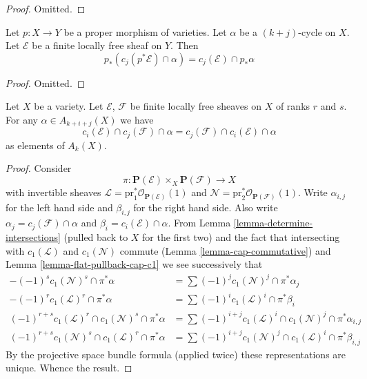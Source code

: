 \begin{proof}
Omitted.
\end{proof}

\begin{lemma}
\label{lemma-pushforward-cap-cj}
Let $p : X \to Y$ be a proper morphism of varieties.
Let $\alpha$ be a $(k + j)$-cycle on $X$.
Let $\mathcal{E}$ be a finite locally free sheaf on $Y$.
Then
$$
p_*(c_j(p^*\mathcal{E}) \cap \alpha) = c_j(\mathcal{E}) \cap p_*\alpha
$$
\end{lemma}

\begin{proof}
Omitted.
\end{proof}

\begin{lemma}
\label{lemma-cap-commutative-chern}
Let $X$ be a variety.
Let $\mathcal{E}$, $\mathcal{F}$ be finite locally free sheaves on $X$
of ranks $r$ and $s$.
For any $\alpha \in A_{k + i + j}(X)$ we have
$$
c_i(\mathcal{E}) \cap c_j(\mathcal{F}) \cap \alpha
=
c_j(\mathcal{F}) \cap c_i(\mathcal{E}) \cap \alpha
$$
as elements of $A_k(X)$.
\end{lemma}

\begin{proof}
Consider
$$
\pi : \mathbf{P}(\mathcal{E}) \times_X \mathbf{P}(\mathcal{F})
\longrightarrow
X
$$
with invertible sheaves
$\mathcal{L} = \text{pr}_1^*\mathcal{O}_{\mathbf{P}(\mathcal{E})}(1)$
and
$\mathcal{N} = \text{pr}_2^*\mathcal{O}_{\mathbf{P}(\mathcal{F})}(1)$.
Write $\alpha_{i, j}$ for the left hand side and $\beta_{i, j}$
for the right hand side. Also write
$\alpha_j = c_j(\mathcal{F}) \cap \alpha$ and 
$\beta_i = c_i(\mathcal{E}) \cap \alpha$.
From Lemma \ref{lemma-determine-intersections}
(pulled back to $X$ for the first two)
and the fact that intersecting with $c_1(\mathcal{L})$ and
$c_1(\mathcal{N})$ commute (Lemma \ref{lemma-cap-commutative})
and Lemma \ref{lemma-flat-pullback-cap-c1}
we see successively that
\begin{align*}
-(-1)^s c_1(\mathcal{N})^s \cap \pi^*\alpha
& =
\sum (-1)^j c_1(\mathcal{N})^j \cap \pi^*\alpha_j \\
-(-1)^r c_1(\mathcal{L})^r \cap \pi^*\alpha
& =
\sum (-1)^i c_1(\mathcal{L})^i \cap \pi^*\beta_i \\
(-1)^{r + s}c_1(\mathcal{L})^r \cap c_1(\mathcal{N})^s \cap \pi^*\alpha
& =
\sum
(-1)^{i + j}
c_1(\mathcal{L})^i \cap c_1(\mathcal{N})^j \cap \pi^*\alpha_{i, j} \\
(-1)^{r + s}c_1(\mathcal{N})^s \cap c_1(\mathcal{L})^r \cap \pi^*\alpha
& =
\sum
(-1)^{i + j}
c_1(\mathcal{N})^j \cap c_1(\mathcal{L})^i \cap \pi^*\beta_{i, j}
\end{align*}
By the projective space bundle formula (applied twice) these representations
are unique. Whence the result.
\end{proof}









